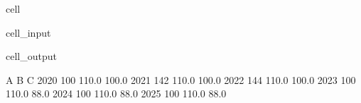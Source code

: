 \documentclass[letterpaper,10pt,english]{jupyterBook}
\begin{document}
\begin{sphinxuseclass}{cell}\begin{sphinxVerbatimInput}

\begin{sphinxuseclass}{cell_input}
\begin{sphinxVerbatim}[commandchars=\\\{\}]
\end{sphinxVerbatim}

\end{sphinxuseclass}\end{sphinxVerbatimInput}
\begin{sphinxVerbatimOutput}

\begin{sphinxuseclass}{cell_output}
\begin{sphinxVerbatim}[commandchars=\\\{\}]
        A      B      C
2020  100  110.0  100.0
2021  142  110.0  100.0
2022  144  110.0  100.0
2023  100  110.0   88.0
2024  100  110.0   88.0
2025  100  110.0   88.0
\end{sphinxVerbatim}

\end{sphinxuseclass}\end{sphinxVerbatimOutput}

\end{sphinxuseclass}
\end{document}
